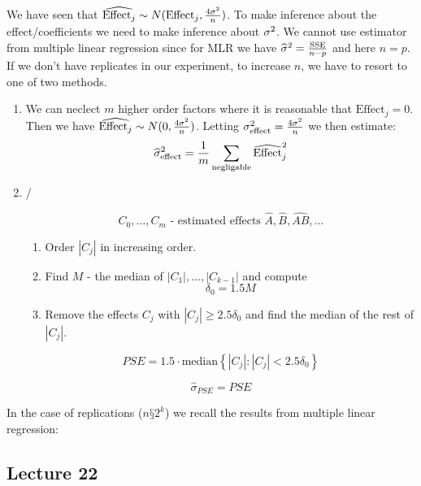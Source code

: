We have seen that $\widehat{\textrm{Effect}_j} \sim N(\textrm{Effect}_j, \frac{4\sigma^2}{n})$. To make inference about the effect/coefficients we need to make inference about $\sigma^2$. We cannot use estimator from multiple linear regression since for MLR we have $\widehat{\sigma}^2=\frac{\textrm{SSE}}{n-p}$ and here $n=p$. If we don't have replicates in our experiment, to increase $n$, we have to resort to one of two methods.
\begin{enumerate}
    \item We can neclect $m$ higher order factors where it is reasonable that $\textrm{Effect}_j = 0$. Then we have $\widehat{\textrm{Effect}_j} \sim N(0, \frac{4\sigma^2}{n})$. Letting $\sigma^2_{\textrm{effect}} = \frac{4\sigma^2}{n}$ we then estimate:
    $$
        \widehat{\sigma}^2_{\textrm{effect}} = \frac{1}{m} \sum_{\textrm{negligable}} \widehat{\textrm{Effect}}_j^2
    $$

    \item {} /  \TODO{}
    
    \[
        C_0, \ldots, C_m \text{ - estimated effects } \hat{A}, \hat{B}, \hat{AB}, \ldots
        \]
        
        \begin{enumerate}
            \item Order $|C_j|$ in increasing order.
            \item Find $M$ - the median of $|C_1|, \ldots, |C_{k-1}|$ and compute \[ \delta_0 = 1.5M \]
            \item Remove the effects $C_j$ with $|C_j| \geq 2.5 \delta_0$ and find the median of the rest of $|C_j|$.
        \end{enumerate}
        
        \[ PSE = 1.5 \cdot \text{median} \left\{ |C_j| : |C_j| < 2.5 \delta_0 \right\} \]
        
        \[ \hat{\sigma}_{PSE} = PSE \]
        
\end{enumerate}




In the case of replications ($n§2^k$) we recall the results from multiple linear regression:


\subsection*{Lecture  22}

